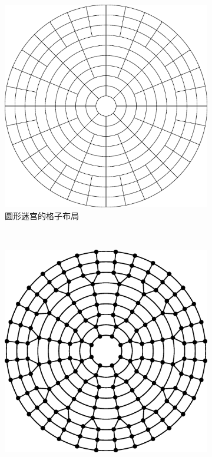 \documentclass[cs4size,a4paper,adobefonts]{ctexart}
\begin{document}
\begin{figure}[htbp]
  \centering
  \begin{subfigure}[c]{0.31\textwidth}
    \centering
    \includegraphics[width=\textwidth]{diskCells}
    \caption{圆形迷宫的格子布局}
  \end{subfigure}
  ~
  \begin{subfigure}[c]{0.31\textwidth}
    \centering
    \includegraphics[width=\textwidth]{diskGraph}

\end{subfigure}
\end{figure}
\end{document}
